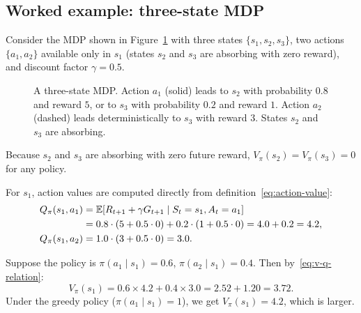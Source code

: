 \subsection*{Worked example: three-state MDP}

\begin{example}
\label{ex:value-computation}
Consider the MDP shown in Figure~\ref{fig:three-state-mdp} with three states $\{s_1, s_2, s_3\}$, two actions $\{a_1, a_2\}$ available only in $s_1$ (states $s_2$ and $s_3$ are absorbing with zero reward), and discount factor $\gamma = 0.5$.

\begin{figure}[ht]
\centering
{}
\caption{A three-state MDP. Action $a_1$ (solid) leads to $s_2$ with probability $0.8$ and reward $5$, or to $s_3$ with probability $0.2$ and reward $1$. Action $a_2$ (dashed) leads deterministically to $s_3$ with reward $3$. States $s_2$ and $s_3$ are absorbing.}
\label{fig:three-state-mdp}
\end{figure}

Because $s_2$ and $s_3$ are absorbing with zero future reward, $V_\pi(s_2) = V_\pi(s_3) = 0$ for any policy.

For $s_1$, action values are computed directly from definition~\eqref{eq:action-value}:
\begin{align*}
Q_\pi(s_1, a_1)
&= \operatorname{\mathbb{E}}[R_{t+1} + \gamma G_{t+1} \mid S_t = s_1, A_t = a_1] \\
&= 0.8 \cdot (5 + 0.5 \cdot 0) + 0.2 \cdot (1 + 0.5 \cdot 0)
 = 4.0 + 0.2 = 4.2, \\
Q_\pi(s_1, a_2)
&= 1.0 \cdot (3 + 0.5 \cdot 0) = 3.0.
\end{align*}

Suppose the policy is $\pi(a_1 \mid s_1) = 0.6$, $\pi(a_2 \mid s_1) = 0.4$. Then by~\eqref{eq:v-q-relation}:
\[
V_\pi(s_1) = 0.6 \times 4.2 + 0.4 \times 3.0 = 2.52 + 1.20 = 3.72.
\]
Under the greedy policy ($\pi(a_1 \mid s_1) = 1$), we get $V_\pi(s_1) = 4.2$, which is larger.
\end{example}


